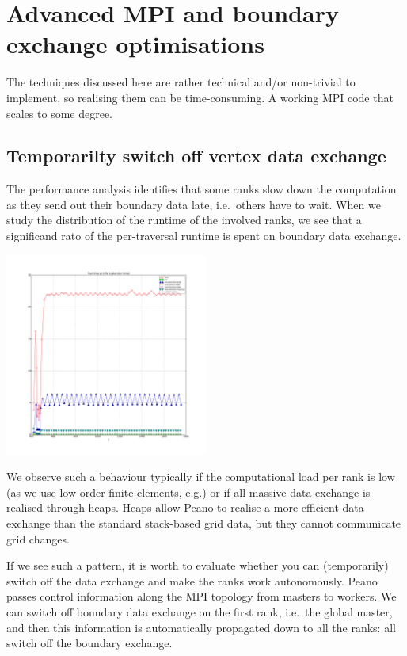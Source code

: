 \section{Advanced MPI and boundary exchange optimisations}


\chapterDescription
  {
    The techniques discussed here are rather technical and/or non-trivial to
    implement, so realising them can be time-consuming.
  }
  {
    A working MPI code that scales to some degree.
  }



\subsection{Temporarilty switch off vertex data exchange}


\begin{smell}
  The performance analysis identifies that some ranks slow down the computation
  as they send out their boundary data late, i.e.~others have to wait. When we
  study the distribution of the runtime of the involved ranks, we see that a
  significand rato of the per-traversal runtime is spent on boundary data
  exchange.
\end{smell}


\begin{center}
  \includegraphics[width=0.5\textwidth]{64_advanced-mpi/boundary-exchange.pdf}
\end{center}


\noindent
We observe such a behaviour typically if the computational load per rank is low
(as we use low order finite elements, e.g.) or if all massive data exchange is
realised through heaps.
Heaps allow Peano to realise a more efficient data exchange than the standard
stack-based grid data, but they cannot communicate grid changes.

If we see such a pattern, it is worth to evaluate whether you can (temporarily)
switch off the data exchange and make the ranks work autonomously.
Peano passes control information along the MPI topology from masters to workers. 
We can switch off boundary data exchange on the first rank, i.e.~the global
master, and then this information is automatically propagated down to all the
ranks: all switch off the boundary exchange.

